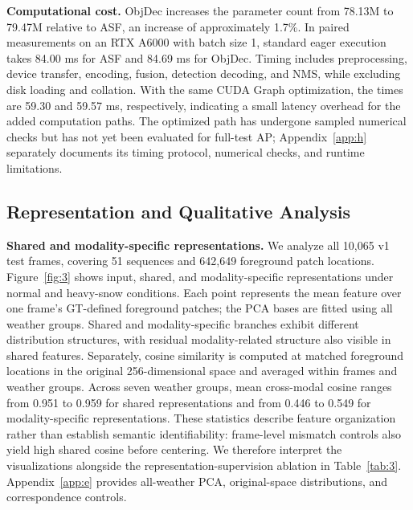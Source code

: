 \textbf{Computational cost.} ObjDec increases the parameter count from 78.13M to 79.47M relative to ASF, an increase of approximately 1.7\%. In paired measurements on an RTX A6000 with batch size 1, standard eager execution takes 84.00 ms for ASF and 84.69 ms for ObjDec. Timing includes preprocessing, device transfer, encoding, fusion, detection decoding, and NMS, while excluding disk loading and collation. With the same CUDA Graph optimization, the times are 59.30 and 59.57 ms, respectively, indicating a small latency overhead for the added computation paths. The optimized path has undergone sampled numerical checks but has not yet been evaluated for full-test AP; Appendix~\ref{app:h} separately documents its timing protocol, numerical checks, and runtime limitations.

\subsection{Representation and Qualitative Analysis}
\label{subsec:44}

\textbf{Shared and modality-specific representations.} We analyze all 10,065 v1 test frames, covering 51 sequences and 642,649 foreground patch locations. Figure~\ref{fig:3} shows input, shared, and modality-specific representations under normal and heavy-snow conditions. Each point represents the mean feature over one frame's GT-defined foreground patches; the PCA bases are fitted using all weather groups. Shared and modality-specific branches exhibit different distribution structures, with residual modality-related structure also visible in shared features. Separately, cosine similarity is computed at matched foreground locations in the original 256-dimensional space and averaged within frames and weather groups. Across seven weather groups, mean cross-modal cosine ranges from 0.951 to 0.959 for shared representations and from 0.446 to 0.549 for modality-specific representations. These statistics describe feature organization rather than establish semantic identifiability: frame-level mismatch controls also yield high shared cosine before centering. We therefore interpret the visualizations alongside the representation-supervision ablation in Table~\ref{tab:3}. Appendix~\ref{app:e} provides all-weather PCA, original-space distributions, and correspondence controls.


